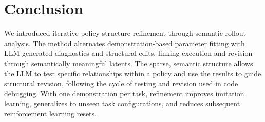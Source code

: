 \section{Conclusion}
\label{sec:conclusion}
\label{sec:takeaway}

We introduced iterative policy structure refinement through semantic rollout analysis.
The method alternates demonstration-based parameter fitting with LLM-generated diagnostics and structural edits, linking execution and revision through semantically meaningful latents.
The sparse, semantic structure allows the LLM to test specific relationships within a policy and use the results to guide structural revision, following the cycle of testing and revision used in code debugging.
With one demonstration per task, refinement improves imitation learning, generalizes to unseen task configurations, and reduces subsequent reinforcement learning resets.